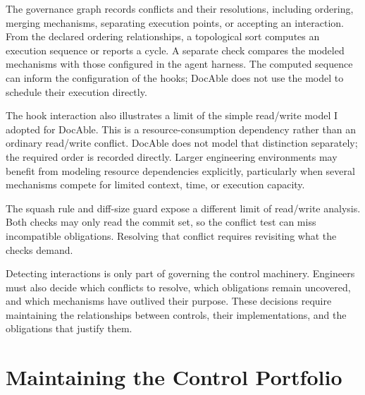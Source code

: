The governance graph records conflicts and their resolutions, including ordering, merging mechanisms, separating execution points, or accepting an interaction. From the declared ordering relationships, a topological sort computes an execution sequence or reports a cycle. A separate check compares the modeled mechanisms with those configured in the agent harness. The computed sequence can inform the configuration of the hooks; DocAble does not use the model to schedule their execution directly.

The hook interaction also illustrates a limit of the simple read/write model I adopted for DocAble. This is a resource-consumption dependency rather than an ordinary read/write conflict. DocAble does not model that distinction separately; the required order is recorded directly. Larger engineering environments may benefit from modeling resource dependencies explicitly, particularly when several mechanisms compete for limited context, time, or execution capacity.

The squash rule and diff-size guard expose a different limit of read/write analysis. Both checks may only read the commit set, so the conflict test can miss incompatible obligations. Resolving that conflict requires revisiting what the checks demand.

Detecting interactions is only part of governing the control machinery. Engineers must also decide which conflicts to resolve, which obligations remain uncovered, and which mechanisms have outlived their purpose. These decisions require maintaining the relationships between controls, their implementations, and the obligations that justify them.

\section{Maintaining the Control Portfolio}\label{heading:add-reconcile-and-retire-controls}


